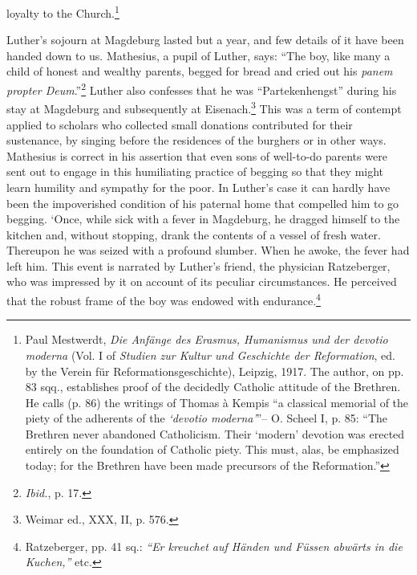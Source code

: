 loyalty to the Church.\footnote
{Paul Mestwerdt, \textit{Die Anfänge des Erasmus, Humanismus und der devotio moderna}
(Vol. I of \textit{Studien zur Kultur und Geschichte der Reformation}, ed. by the Verein für
Reformationsgeschichte), Leipzig, 1917. The author, on pp. 83 sqq., establishes proof of
the decidedly Catholic attitude of the Brethren. He calls (p. 86) the writings of Thomas
à Kempis “a classical memorial of the piety of the adherents of the \textit{‘devotio moderna’}”--
O. Scheel I, p. 85: “The Brethren never abandoned Catholicism. Their ‘modern’ devotion
was erected entirely on the foundation of Catholic piety. This must, alas, be emphasized
today; for the Brethren have been made precursors of the Reformation.”
}

Luther’s sojourn at Magdeburg lasted but a year, and few details
of it have been handed down to us. Mathesius, a pupil of Luther,
says: “The boy, like many a child of honest and wealthy parents,
begged for bread and cried out his \textit{panem propter Deum}.”\footnote{\textit{Ibid.}, p. 17.}
Luther
also confesses that he was “Partekenhengst” during his stay at Magdeburg
and subsequently at Eisenach.\footnote{Weimar ed., XXX, II, p. 576.}
This was a term of contempt
applied to scholars who collected small donations contributed for their
sustenance, by singing before the residences of the burghers or in other
ways. Mathesius is correct in his assertion that even sons of well-to-do
parents were sent out to engage in this humiliating practice of begging
so that they might learn humility and sympathy for the poor. In
Luther’s case it can hardly have been the impoverished condition of
his paternal home that compelled him to go begging.
‘Once, while sick with a fever in Magdeburg, he dragged himself to
the kitchen and, without stopping, drank the contents of a vessel of
fresh water. Thereupon he was seized with a profound slumber. When
he awoke, the fever had left him. This event is narrated by Luther’s
friend, the physician Ratzeberger, who was impressed by it on account
of its peculiar circumstances. He perceived that the robust
frame of the boy was endowed with endurance.\footnote{Ratzeberger, pp. 41 sq.: \textit{“Er kreuchet auf Händen und Füssen abwärts in die Kuchen,”} etc.}

